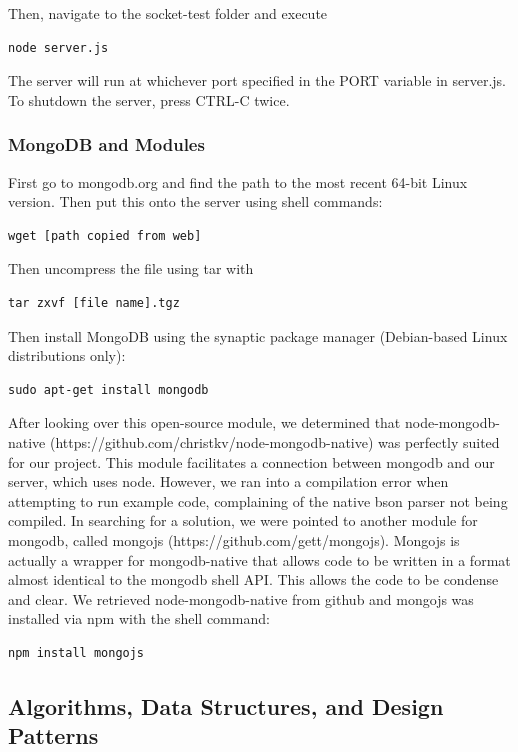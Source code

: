 \documentclass[letterpaper,12pt]{article}
\begin{document}
Then, navigate to the socket-test folder and execute

\begin{verbatim}
node server.js
\end{verbatim}

The server will run at whichever port specified in the PORT variable in server.js. To shutdown the server, press CTRL-C twice.

\subsubsection{MongoDB and Modules}
First go to mongodb.org and find the path to the most recent 64-bit Linux version. Then put this onto the server using shell commands:

\begin{verbatim}
wget [path copied from web]
\end{verbatim}
Then uncompress the file using tar with

\begin{verbatim}
tar zxvf [file name].tgz
\end{verbatim}

Then install MongoDB using the synaptic package manager (Debian-based Linux distributions only):
\begin{verbatim}
sudo apt-get install mongodb
\end{verbatim}

After looking over this open-source module, we determined that node-mongodb-native (https://github.com/christkv/node-mongodb-native) was perfectly suited for our project. This module facilitates a connection between mongodb and our server, which uses node. However, we ran into a compilation error when attempting to run example code, complaining of the native bson parser not being compiled.
In searching for a solution, we were pointed to another module for mongodb, called mongojs (https://github.com/gett/mongojs). Mongojs is actually a wrapper for mongodb-native that allows code to be written in a format almost identical to the mongodb shell API. This allows the code to be condense and clear.
We retrieved node-mongodb-native from github and mongojs was installed via npm with the shell command:
\begin{verbatim}
npm install mongojs
\end{verbatim}

\subsection{Algorithms, Data Structures, and Design Patterns}
\end{document}
